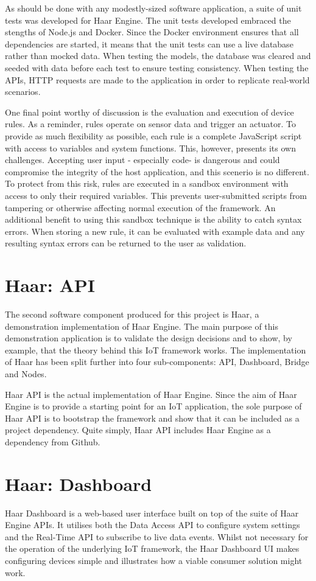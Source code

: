     As should be done with any modestly-sized software application, a suite of unit tests was developed for Haar Engine. The unit tests developed embraced the stengths of Node.js and Docker. Since the Docker environment ensures that all dependencies are started, it means that the unit tests can use a live database rather than mocked data. When testing the models, the database was cleared and seeded with data before each test to ensure testing consistency. When testing the APIs, HTTP requests are made to the application in order to replicate real-world scenarios.

    One final point worthy of discussion is the evaluation and execution of device rules. As a reminder, rules operate on sensor data and trigger an actuator. To provide as much flexibility as possible, each rule is a complete JavaScript script with access to variables and system functions. This, however, presents its own challenges. Accepting user input - especially code- is dangerous and could compromise the integrity of the host application, and this scenerio is no different. To protect from this risk, rules are executed in a sandbox environment with access to only their required variables. This prevents user-submitted scripts from tampering or otherwise affecting normal execution of the framework. An additional benefit to using this sandbox technique is the ability to catch syntax errors. When storing a new rule, it can be evaluated with example data and any resulting syntax errors can be returned to the user as validation.

  \section{Haar: API}
    The second software component produced for this project is Haar, a demonstration implementation of Haar Engine. The main purpose of this demonstration application is to validate the design decisions and to show, by example, that the theory behind this IoT framework works. The implementation of Haar has been split further into four sub-components: API, Dashboard, Bridge and Nodes.

    Haar API is the actual implementation of Haar Engine. Since the aim of Haar Engine is to provide a starting point for an IoT application, the sole purpose of Haar API is to bootstrap the framework and show that it can be included as a project dependency. Quite simply, Haar API includes Haar Engine as a dependency from Github.

  \section{Haar: Dashboard}
    Haar Dashboard is a web-based user interface built on top of the suite of Haar Engine APIs. It utilises both the Data Access API to configure system settings and the Real-Time API to subscribe to live data events. Whilst not necessary for the operation of the underlying IoT framework, the Haar Dashboard UI makes configuring devices simple and illustrates how a viable consumer solution might work.

